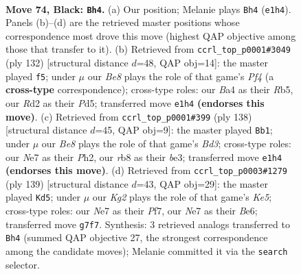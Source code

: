 \documentclass[11pt]{article}
\begin{document}
\clearpage

\begin{figure}[p]\centering
\begin{subfigure}{0.46\textwidth}\centering
\resizebox{\linewidth}{!}{%
\newchessgame
\chessboard[
  setfen={1R6/p3n1k1/P3R3/1P3p2/b4P2/8/3r4/4b1K1 b - - 4 74},
  showmover=false,
  pgfstyle=straightmove, color=movearrow, markmove={e1-h4}
]}
\caption{}
\end{subfigure}\hfill
\begin{subfigure}{0.46\textwidth}\centering
\resizebox{\linewidth}{!}{%
\newchessgame
\chessboard[
  setfen={8/4k3/1p3r1p/1R1PN3/3K1PP1/8/8/4r3 w - - 1 67},
  showmover=false,
  pgfstyle=straightmove, color=movearrow, markmove={f4-f5}
]}
\caption{}
\end{subfigure}
\\[4pt]
\begin{subfigure}{0.46\textwidth}\centering
\resizebox{\linewidth}{!}{%
\newchessgame
\chessboard[
  setfen={8/4k2p/8/5R2/5p1r/3BbP2/6KP/8 w - - 14 70},
  showmover=false,
  pgfstyle=straightmove, color=movearrow, markmove={d3-b1}
]}
\caption{}
\end{subfigure}\hfill
\begin{subfigure}{0.46\textwidth}\centering
\resizebox{\linewidth}{!}{%
\newchessgame
\chessboard[
  setfen={8/5p1p/4bR2/6P1/p1r1k3/K1P3R1/8/8 b - - 58 70},
  showmover=false,
  pgfstyle=straightmove, color=movearrow, markmove={e4-d5}
]}
\caption{}
\end{subfigure}
\caption{\textbf{Move 74, Black: \texttt{Bh4}.} (a) Our position; Melanie plays \texttt{Bh4} (\texttt{e1h4}). Panels (b)--(d) are the retrieved master positions whose correspondence most drove this move (highest QAP objective among those that transfer to it). (b) Retrieved from \texttt{ccrl\_top\_p0001\#3049} (ply 132) [structural distance $d$=48, QAP obj=14]: the master played \texttt{f5}; under $\mu$ our \emph{Be8} plays the role of that game's \emph{Pf4} (a \textbf{cross-type} correspondence); cross-type roles: our \emph{B}a4 as their \emph{R}b5, our \emph{R}d2 as their \emph{P}d5; transferred move \texttt{e1h4} \textbf{(endorses this move)}. (c) Retrieved from \texttt{ccrl\_top\_p0001\#399} (ply 138) [structural distance $d$=45, QAP obj=9]: the master played \texttt{Bb1}; under $\mu$ our \emph{Be8} plays the role of that game's \emph{Bd3}; cross-type roles: our \emph{N}e7 as their \emph{P}h2, our \emph{r}b8 as their \emph{b}e3; transferred move \texttt{e1h4} \textbf{(endorses this move)}. (d) Retrieved from \texttt{ccrl\_top\_p0003\#1279} (ply 139) [structural distance $d$=43, QAP obj=29]: the master played \texttt{Kd5}; under $\mu$ our \emph{Kg2} plays the role of that game's \emph{Ke5}; cross-type roles: our \emph{N}e7 as their \emph{P}f7, our \emph{N}e7 as their \emph{B}e6; transferred move \texttt{g7f7}. Synthesis: 3 retrieved analogs transferred to \texttt{Bh4} (summed QAP objective 27, the strongest correspondence among the candidate moves); Melanie committed it via the \texttt{search} selector.}
\label{fig:thought-m147}
\end{figure}
\end{document}
